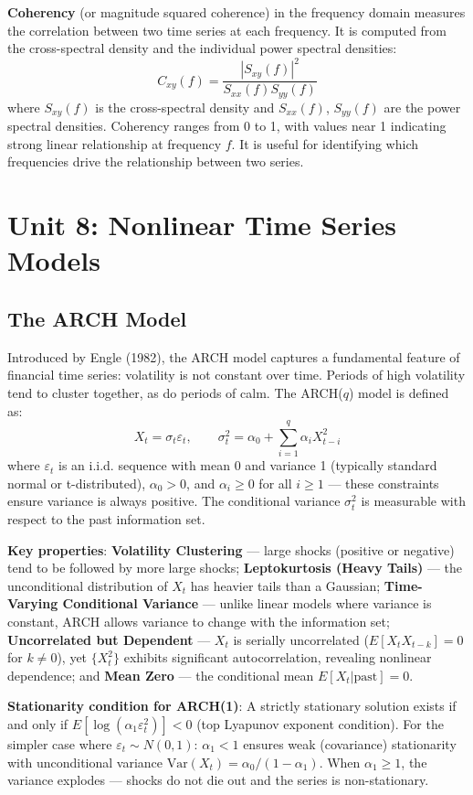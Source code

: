 \documentclass[11pt,a4paper]{article}
\begin{document}
\textbf{Coherency} (or magnitude squared coherence) in the frequency domain measures the correlation between two time series at each frequency. It is computed from the cross-spectral density and the individual power spectral densities:
\[
C_{xy}(f) = \frac{|S_{xy}(f)|^2}{S_{xx}(f) S_{yy}(f)}
\]
where $S_{xy}(f)$ is the cross-spectral density and $S_{xx}(f)$, $S_{yy}(f)$ are the power spectral densities. Coherency ranges from 0 to 1, with values near 1 indicating strong linear relationship at frequency $f$. It is useful for identifying which frequencies drive the relationship between two series.


\section{Unit 8: Nonlinear Time Series Models}

\subsection{The ARCH Model}

Introduced by Engle (1982), the ARCH model captures a fundamental feature of financial time series: volatility is not constant over time. Periods of high volatility tend to cluster together, as do periods of calm. The ARCH($q$) model is defined as:
\[
X_t = \sigma_t \varepsilon_t, \qquad \sigma_t^2 = \alpha_0 + \sum_{i=1}^q \alpha_i X_{t-i}^2
\]
where $\varepsilon_t$ is an i.i.d. sequence with mean 0 and variance 1 (typically standard normal or t-distributed), $\alpha_0 > 0$, and $\alpha_i \geq 0$ for all $i \geq 1$ --- these constraints ensure variance is always positive. The conditional variance $\sigma_t^2$ is measurable with respect to the past information set.

\textbf{Key properties}: \textbf{Volatility Clustering} --- large shocks (positive or negative) tend to be followed by more large shocks; \textbf{Leptokurtosis (Heavy Tails)} --- the unconditional distribution of $X_t$ has heavier tails than a Gaussian; \textbf{Time-Varying Conditional Variance} --- unlike linear models where variance is constant, ARCH allows variance to change with the information set; \textbf{Uncorrelated but Dependent} --- $X_t$ is serially uncorrelated ($E[X_t X_{t-k}] = 0$ for $k \neq 0$), yet $\{X_t^2\}$ exhibits significant autocorrelation, revealing nonlinear dependence; and \textbf{Mean Zero} --- the conditional mean $E[X_t | \text{past}] = 0$.

\textbf{Stationarity condition for ARCH(1)}: A strictly stationary solution exists if and only if $E[\log(\alpha_1 \varepsilon_t^2)] < 0$ (top Lyapunov exponent condition). For the simpler case where $\varepsilon_t \sim N(0,1)$: $\alpha_1 < 1$ ensures weak (covariance) stationarity with unconditional variance $\text{Var}(X_t) = \alpha_0 / (1 - \alpha_1)$. When $\alpha_1 \geq 1$, the variance explodes --- shocks do not die out and the series is non-stationary.
\end{document}
